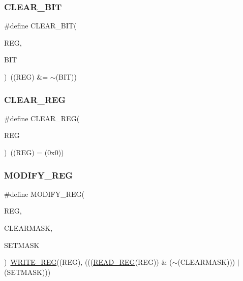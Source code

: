 \subsubsection{\texorpdfstring{CLEAR\_BIT}{CLEAR\_BIT}}
{\footnotesize\ttfamily \#define C\+L\+E\+A\+R\+\_\+\+B\+IT(\begin{DoxyParamCaption}\item[{}]{R\+EG,  }\item[{}]{B\+IT }\end{DoxyParamCaption})~((R\+EG) \&= $\sim$(B\+IT))}

\mbox{\label{group___exported__macro_ga1378fbdda39f40b85420df55f41460ef}} 
\subsubsection{\texorpdfstring{CLEAR\_REG}{CLEAR\_REG}}
{\footnotesize\ttfamily \#define C\+L\+E\+A\+R\+\_\+\+R\+EG(\begin{DoxyParamCaption}\item[{}]{R\+EG }\end{DoxyParamCaption})~((R\+EG) = (0x0))}

\mbox{\label{group___exported__macro_ga6553c99f510c3bab8cc0a91602053247}} 
\subsubsection{\texorpdfstring{MODIFY\_REG}{MODIFY\_REG}}
{\footnotesize\ttfamily \#define M\+O\+D\+I\+F\+Y\+\_\+\+R\+EG(\begin{DoxyParamCaption}\item[{}]{R\+EG,  }\item[{}]{C\+L\+E\+A\+R\+M\+A\+SK,  }\item[{}]{S\+E\+T\+M\+A\+SK }\end{DoxyParamCaption})~\mbox{\hyperlink{group___exported__macro_ga32f78bffcaf6d13023dcd7f05e0c4d57}{W\+R\+I\+T\+E\+\_\+\+R\+EG}}((R\+EG), (((\mbox{\hyperlink{group___exported__macro_gae7f188a4d26c9e713a48414783421071}{R\+E\+A\+D\+\_\+\+R\+EG}}(R\+EG)) \& ($\sim$(C\+L\+E\+A\+R\+M\+A\+SK))) $\vert$ (S\+E\+T\+M\+A\+SK)))}

